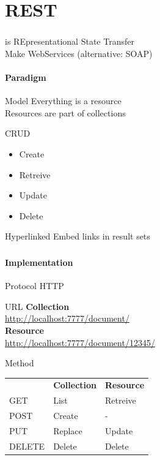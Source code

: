 \documentclass[handout]{beamer}
\begin{document}
\section{REST}
\begin{frame}
	\frametitle{\insertsection}
	\begin{block}{is}
		REpresentational State Transfer\\
		Make WebServices (alternative: SOAP)
	\end{block}
	\framesubtitle{Paradigm}
	\begin{block}{Model}
		Everything is a resource \\
		Resources are part of collections
	\end{block}
	\begin{block}{CRUD}
		\begin{itemize}
			\item Create
			\item Retreive
			\item Update
			\item Delete
		\end{itemize}
	\end{block}
	\begin{block}{Hyperlinked}
		Embed links in result sets
	\end{block}
\end{frame}

\begin{frame}
	\frametitle{\insertsection}
	\framesubtitle{Implementation}
	\begin{block}{Protocol}
		HTTP
	\end{block}
	\begin{block}{URL}
		\textbf{Collection} \\
		\url{http://localhost:7777/document/} \\
		\textbf{Resource} \\
		\url{http://localhost:7777/document/12345/}
	\end{block}
	\begin{block}{Method}
		\begin{tabular}{lll}
			& \textbf{Collection} & \textbf{Resource} \\
			GET & List & Retreive \\
			POST & Create &  - \\
			PUT & Replace & Update \\
			DELETE & Delete & Delete \\
		\end{tabular}
	\end{block}
\end{frame}
\end{document}
